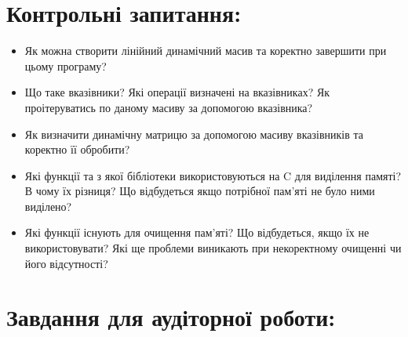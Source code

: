 \documentclass[a5paper,titlepage,openany,twoside,draft]{book_unv}%
\begin{document}
\section{Контрольні запитання:}
\begin{itemize}
\item
  Як можна створити лінійний динамічний масив та коректно завершити при
  цьому програму?
\item
  Що таке вказівники? Які операції визначені на вказівниках? Як
  проітеруватись по даному масиву за допомогою вказівника?
\item
  Як визначити динамічну матрицю за допомогою масиву вказівників та
  коректно її обробити?
\item
  Які функції та з якої бібліотеки використовуються на C для виділення
  памяті? В чому їх різниця? Що відбудеться якщо потрібної пам'яті не
  було ними виділено?
\item
  Які функції існують для очищення пам'яті? Що відбудеться, якщо їх не
  використовувати? Які ще проблеми виникають при некоректному очищенні
  чи його відсутності?
\end{itemize}

\section{Завдання для аудіторної роботи:}
\end{document}
